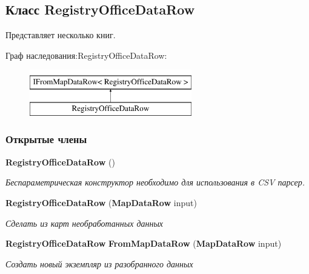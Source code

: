 \subsection{Класс Registry\+Office\+Data\+Row}
\label{classkdz__manager_1_1_registry_office_data_row}


Представляет несколько книг.  


Граф наследования\+:Registry\+Office\+Data\+Row\+:\begin{figure}[H]
\begin{center}
\leavevmode
\includegraphics[height=2.000000cm]{classkdz__manager_1_1_registry_office_data_row}
\end{center}
\end{figure}
\subsubsection*{Открытые члены}
\begin{DoxyCompactItemize}
\item 
{\bf Registry\+Office\+Data\+Row} ()
\begin{DoxyCompactList}\small\item\em Беспараметрическая конструктор необходимо для использования в C\+S\+V парсер. \end{DoxyCompactList}\item 
{\bf Registry\+Office\+Data\+Row} ({\bf Map\+Data\+Row} input)
\begin{DoxyCompactList}\small\item\em Сделать из карт необработанных данных \end{DoxyCompactList}\item 
{\bf Registry\+Office\+Data\+Row} {\bf From\+Map\+Data\+Row} ({\bf Map\+Data\+Row} input)
\begin{DoxyCompactList}\small\item\em Создать новый экземпляр из разобранного данных \end{DoxyCompactList}\end{DoxyCompactItemize}
